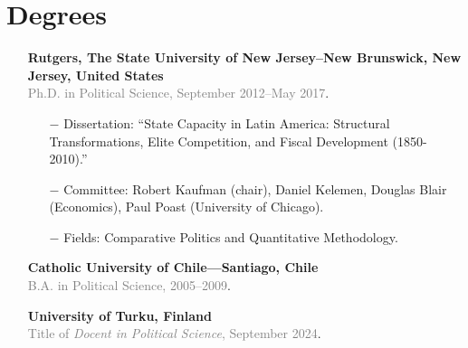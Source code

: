 \section*{Degrees}

\begin{itemize}
  \item[\textcolor{gray}{\textbullet}] {\bf Rutgers, The State University of New Jersey--New Brunswick, New Jersey, United States}\\
  \textcolor{gray}{Ph.D. in Political Science, September 2012--May 2017}.
    	\begin{itemize}
      		\item[$-$] Dissertation: ``State Capacity in Latin America: Structural Transformations, Elite Competition, and Fiscal Development (1850-2010).''
      		\item[$-$] Committee: Robert Kaufman (chair), Daniel Kelemen, Douglas Blair (Economics), Paul Poast (University of Chicago).
          \item[$-$] Fields: Comparative Politics and Quantitative Methodology.
		  \end{itemize}

\item[\textcolor{gray}{\textbullet}] {\bf Catholic University of Chile---Santiago, Chile}\\
\textcolor{gray}{B.A. in Political Science, 2005--2009}.

  \item[\textcolor{gray}{\textbullet}] {\bf University of Turku, Finland}\\
  \textcolor{gray}{Title of \emph{Docent in Political Science}, September 2024}.

\end{itemize}
